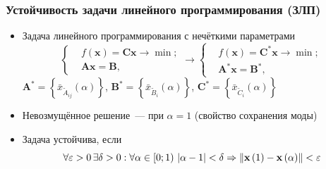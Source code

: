 \documentclass[12pt]{beamer}
\begin{document}
\begin{frame}
  \frametitle{Устойчивость задачи линейного программирования (ЗЛП)}
  \begin{itemize}
    \item Задача линейного программирования с нечёткими параметрами
    \begin{equation}
      \label{eq:fuzzy-lp-unstable-problem}
      \left\{ \begin{aligned}
        & f\left( \mathbf{x} \right)=\mathbf{Cx}\to \min;  \\ 
        & \mathbf{Ax}=\mathbf{B},
      \end{aligned} \right.
      \to
      \left\{ \begin{aligned}
        & f\left( \mathbf{x} \right)={\mathbf{C}^{*}}\mathbf{x}\to \min;  \\ 
        & {\mathbf{A}^{*}}\mathbf{x}={\mathbf{B}}^{*},
      \end{aligned} \right.
    \end{equation}
    $\mathbf{A}^{*}=\left\{ \bar{x}_{\tilde{A}_{ij}}\left(\alpha \right) \right\}$, $\mathbf{B}^{*}=\left\{ \bar{x}_{\tilde{B}_i}\left(\alpha \right) \right\}$, $\mathbf{C}^{*}=\left\{ \bar{x}_{\tilde{C}_i}\left(\alpha \right) \right\}$
    \item Невозмущённое решение~--- при $\alpha=1$ (свойство сохранения моды)
    \item Задача устойчива, если
      \begin{equation}
      \label{eq:fuzzy-solution-stability}
        \forall \varepsilon >0\, \exists \delta >0:\forall \alpha \in \left[0; 1\right)\,\left| \alpha -1 \right|<\delta \linebreak \Rightarrow \left\| \mathbf{x}\left( 1 \right)-\mathbf{x}\left( \alpha  \right) \right\|<\varepsilon
      \end{equation}
  \end{itemize}
\end{frame}

\end{document}
